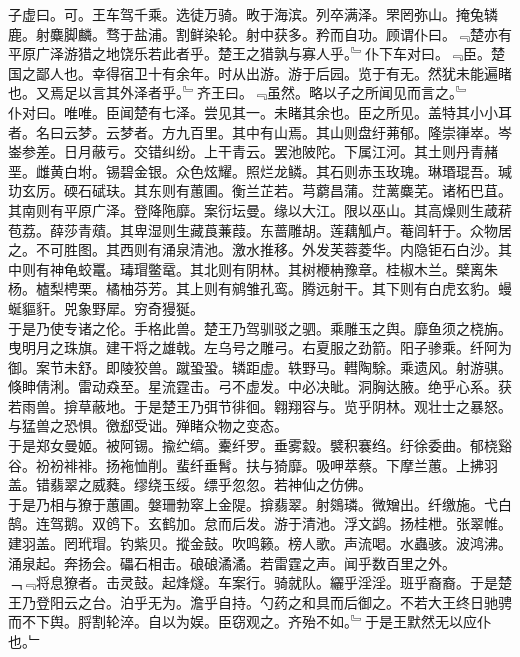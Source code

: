 \documentclass{zhvt-classic}
\begin{document}
\hspace*{2em}子虚曰。可。王车驾千乘。选徒万骑。畋于海滨。列卒满泽。罘罔弥山。掩兔辚鹿。射麋脚麟。骛于盐浦。割鲜染轮。射中获多。矜而自功。顾谓仆曰。﹃楚亦有平原广泽游猎之地饶乐若此者乎。楚王之猎孰与寡人乎。﹄仆下车对曰。﹃臣。楚国之鄙人也。幸得宿卫十有余年。时从出游。游于后园。览于有无。然犹未能遍睹也。又焉足以言其外泽者乎。﹄齐王曰。﹃虽然。略以子之所闻见而言之。﹄\\
\hspace*{2em}仆对曰。唯唯。臣闻楚有七泽。尝见其一。未睹其余也。臣之所见。盖特其小小耳者。名曰云梦。云梦者。方九百里。其中有山焉。其山则盘纡茀郁。隆崇嵂崒。岑崟参差。日月蔽亏。交错纠纷。上干青云。罢池陂陀。下属江河。其土则丹青赭垩。雌黄白坿。锡碧金银。众色炫耀。照烂龙鳞。其石则赤玉玫瑰。琳瑉琨吾。瑊玏玄厉。碝石碔玞。其东则有蕙圃。衡兰芷若。芎藭昌蒲。茳蓠麋芜。诸柘巴苴。其南则有平原广泽。登降陁靡。案衍坛曼。缘以大江。限以巫山。其高燥则生葴菥苞荔。薛莎青薠。其卑湿则生藏莨蒹葭。东蔷雕胡。莲藕觚卢。菴闾轩于。众物居之。不可胜图。其西则有涌泉清池。激水推移。外发芙蓉菱华。内隐钜石白沙。其中则有神龟蛟鼍。瑇瑁鳖鼋。其北则有阴林。其树楩柟豫章。桂椒木兰。檗离朱杨。樝梨梬栗。橘柚芬芳。其上则有鹓雏孔鸾。腾远射干。其下则有白虎玄豹。蟃蜒貙豻。兕象野犀。穷奇獌狿。\\
\hspace*{2em}于是乃使专诸之伦。手格此兽。楚王乃驾驯驳之驷。乘雕玉之舆。靡鱼须之桡旃。曳明月之珠旗。建干将之雄戟。左乌号之雕弓。右夏服之劲箭。阳子骖乘。纤阿为御。案节未舒。即陵狡兽。蹴蛩蛩。辚距虚。轶野马。轊陶駼。乘遗风。射游骐。倏眒倩浰。雷动猋至。星流霆击。弓不虚发。中必决眦。洞胸达腋。绝乎心系。获若雨兽。揜草蔽地。于是楚王乃弭节徘徊。翱翔容与。览乎阴林。观壮士之暴怒。与猛兽之恐惧。徼郄受诎。殚睹众物之变态。\\
\hspace*{2em}于是郑女曼姬。被阿锡。揄纻缟。櫜纤罗。垂雾縠。襞积褰绉。纡徐委曲。郁桡谿谷。衯衯裶裶。扬袘恤削。蜚纤垂髾。扶与猗靡。吸呷萃蔡。下摩兰蕙。上拂羽盖。错翡翠之威蕤。缪绕玉绥。缥乎忽忽。若神仙之仿佛。\\
\hspace*{2em}于是乃相与獠于蕙圃。媻珊勃窣上金隄。揜翡翠。射鵕璘。微矰出。纤缴施。弋白鹄。连驾鹅。双鸧下。玄鹤加。怠而后发。游于清池。浮文鹢。扬桂枻。张翠帷。建羽盖。罔玳瑁。钓紫贝。摐金鼓。吹鸣籁。榜人歌。声流喝。水蟲骇。波鸿沸。涌泉起。奔扬会。礧石相击。硠硠潏潏。若雷霆之声。闻乎数百里之外。\\
\hspace*{2em}﹁﹃将息獠者。击灵鼓。起烽燧。车案行。骑就队。纚乎淫淫。班乎裔裔。于是楚王乃登阳云之台。泊乎无为。澹乎自持。勺药之和具而后御之。不若大王终日驰骋而不下舆。脟割轮淬。自以为娱。臣窃观之。齐殆不如。﹄于是王默然无以应仆也。﹂\\
\end{document}
